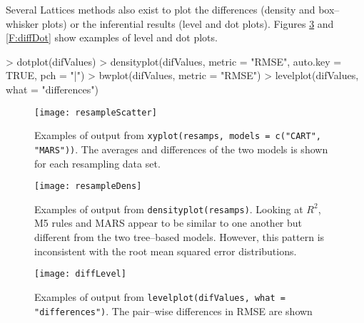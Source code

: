 \documentclass[12pt]{article}
\begin{document}
Several Lattices methods also exist to plot the differences (density
and box--whisker plots) or the inferential results (level and dot
plots). Figures \ref{F:diffLevel} and \ref{F:diffDot} show examples of
level and dot plots.

\begin{Schunk}
\begin{Sinput}
> dotplot(difValues)
> densityplot(difValues, metric = "RMSE", auto.key = TRUE, pch = "|")
> bwplot(difValues, metric = "RMSE")
> levelplot(difValues, what = "differences")
\end{Sinput}
\end{Schunk}



\begin{figure}
   \begin{center}		
      \texttt{[image: resampleScatter]}    

      \caption{ Examples of output from \texttt{xyplot(resamps, models = c("CART", "MARS"))}. The averages and differences of the two models is shown for each resampling data set.}
      \label{f:resampleScatter} 
    \end{center}
\end{figure} 

\begin{figure}
   \begin{center}		
      \texttt{[image: resampleDens]}    

      \caption{ Examples of output from
        \texttt{densityplot(resamps)}. Looking at $R^2$, M5 rules and MARS appear to be
        similar to one another but different from the two tree--based
        models. However, this pattern is inconsistent with the root
        mean squared error distributions.}
      \label{F:resampleDens} 
    \end{center}
\end{figure} 


\begin{figure}
   \begin{center}		
      \texttt{[image: diffLevel]}    

      \caption{ Examples of output from \texttt{levelplot(difValues,
          what = "differences")}. The pair--wise differences in RMSE
        are shown}
      \label{F:diffLevel} 
    \end{center}
\end{figure} 
\end{document}
